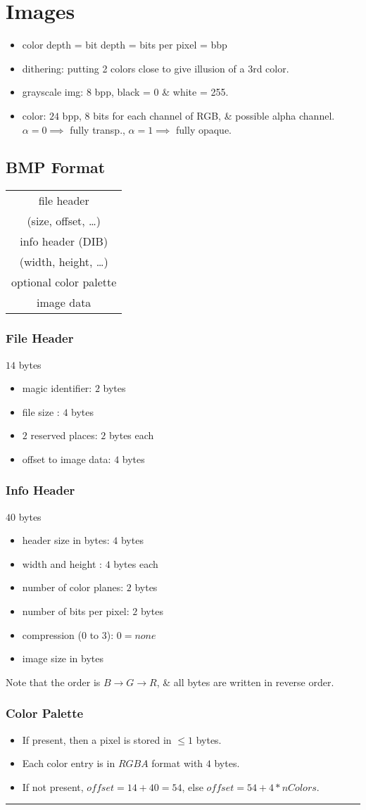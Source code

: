 \section{Images}
\begin{itemize}
  \item color depth = bit depth = bits per pixel = bbp
  \item dithering: putting 2 colors close to give illusion of a 3rd color.
  \item grayscale img: $8$ bpp, black = 0 \& white = 255.
  \item color: $24$ bpp, $8$ bits for each channel of RGB, \& possible alpha channel. $\alpha = 0 \implies$ fully transp., $\alpha = 1 \implies$ fully opaque.
\end{itemize}
\subsection{BMP Format}
\begin{tabular}{|c|}
  \hline
  file header\\
  (size, offset, \dots)\\
  \hline
  info header (DIB)\\
  (width, height, \dots)\\
  \hline
  optional color palette\\
  \hline
  image data\\
  \hline
\end{tabular}
\subsubsection{File Header}
$14$ bytes
\begin{itemize}
  \item magic identifier: $2$ bytes
  \item file size : $4$ bytes
  \item $2$ reserved places: $2$ bytes each
  \item offset to image data: $4$ bytes
\end{itemize}
\subsubsection{Info Header}
$40$ bytes
\begin{itemize}
  \item header size in bytes: $4$ bytes
  \item width and height : $4$ bytes each
  \item number of color planes: $2$ bytes
  \item number of bits per pixel: $2$ bytes
  \item compression (0 to 3): $0 = none$
  \item image size in bytes
\end{itemize}
{\color{red} Note that the order is $B \rightarrow G \rightarrow R$, \& all bytes are written in reverse order.}
\subsubsection{Color Palette}
\begin{itemize}
  \item If present, then a pixel is stored in $\leq 1$ bytes.
  \item Each color entry is in $RGBA$ format with $4$ bytes.
  \item If not present, $offset = 14+40 =54$, else $offset=54+4*nColors$.
\end{itemize}
\hrule
